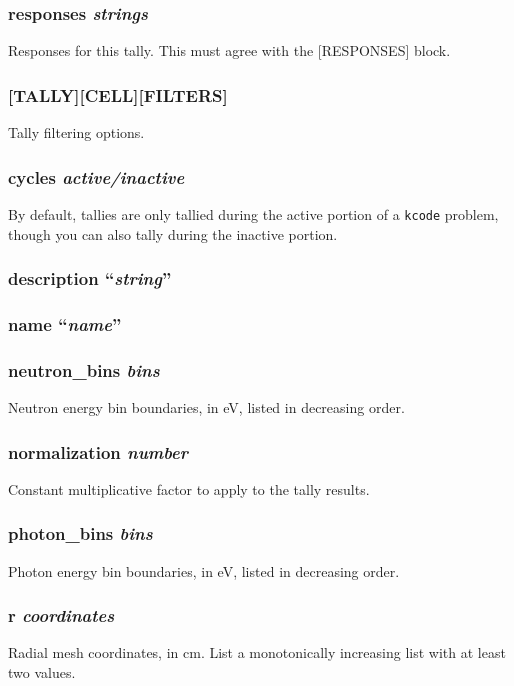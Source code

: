\documentclass[10pt]{article}
\begin{document}
\subsubsection{responses \textit{strings}}
Responses for this tally. This must agree with the [RESPONSES] block. 

\subsubsection{[TALLY][CELL][FILTERS]}
Tally filtering options.

\subsubsection{cycles \textit{active/inactive}}
By default, tallies are only tallied during the active portion of a \texttt{kcode} problem, though you can also tally during the inactive portion. 

\subsubsection{description ``\textit{string}''}

\subsubsection{name ``\textit{name}''}

\subsubsection{neutron\_bins \textit{bins}}
Neutron energy bin boundaries, in eV, listed in decreasing order.

\subsubsection{normalization \textit{number}}
Constant multiplicative factor to apply to the tally results. 

\subsubsection{photon\_bins \textit{bins}}
Photon energy bin boundaries, in eV, listed in decreasing order.

\subsubsection{r \textit{coordinates}}
Radial mesh coordinates, in cm. List a monotonically increasing list with at least two values. 
\end{document}

